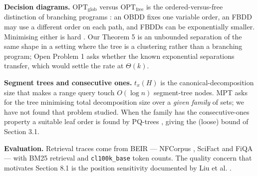 \documentclass[11pt]{article}
\theoremstyle{plain}
\begin{document}
\textbf{Decision diagrams.} $\mathrm{OPT}_{\mathrm{glob}}$ versus $\mathrm{OPT}_{\mathrm{free}}$ is the ordered-versus-free distinction of branching programs \cite{BRY86,WEG00}: an OBDD fixes one variable order, an FBDD may use a different order on each path, and FBDDs can be exponentially smaller. Minimising either is hard \cite{SIE02}. Our Theorem 5 is an unbounded separation of the same shape in a setting where the tree is a clustering rather than a branching program; Open Problem 1 asks whether the known exponential separations transfer, which would settle the rate at $\Theta(k)$.

\textbf{Segment trees and consecutive ones.} $t_x(H)$ is the canonical-decomposition size that makes a range query touch $O(\log n)$ segment-tree nodes. MPT asks for the tree minimising total decomposition size over a \emph{given family} of sets; we have not found that problem studied. When the family has the consecutive-ones property a suitable leaf order is found by PQ-trees \cite{BL76}, giving the (loose) bound of Section 3.1.

\textbf{Evaluation.} Retrieval traces come from BEIR \cite{THA21} --- NFCorpus \cite{BOT16}, SciFact \cite{WAD20} and FiQA \cite{MAI18} --- with BM25 retrieval and \texttt{cl100k\string\_base} token counts. The quality concern that motivates Section 8.1 is the position sensitivity documented by Liu et al. \cite{LIU24}.
\end{document}
